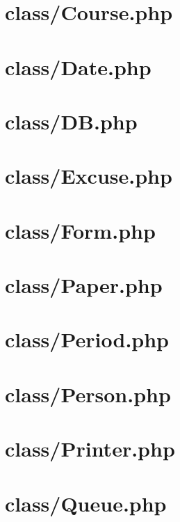 \documentclass[12pt,a4paper,twoside,openany]{report}
\begin{document}
\newpage\section{class/Course.php}


\newpage\section{class/Date.php}


\newpage\section{class/DB.php}


\newpage\section{class/Excuse.php}


\newpage\section{class/Form.php}


\newpage\section{class/Paper.php}


\newpage\section{class/Period.php}


\newpage\section{class/Person.php}


\newpage\section{class/Printer.php}


\newpage\section{class/Queue.php}

\end{document}
